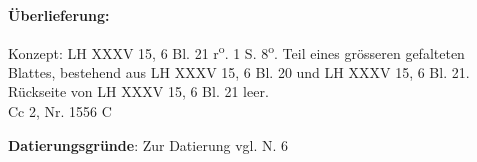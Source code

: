    
        
        \begin{ledgroupsized}[r]{120mm}
        \footnotesize 
        \pstart        
        \noindent\textbf{\"{U}berlieferung:}  
        \pend
        \end{ledgroupsized}
      
       
              \begin{ledgroupsized}[r]{114mm}
              \footnotesize 
              \pstart \parindent -6mm
              Konzept: LH XXXV 15, 6 Bl. 21 r\textsuperscript{o}. 1 S. 8\textsuperscript{o}. Teil eines gr\"{o}sseren gefalteten Blattes, bestehend aus LH XXXV 15, 6 Bl. 20 und LH XXXV 15, 6 Bl. 21. R\"{u}ckseite von LH XXXV 15, 6 Bl. 21 leer.\\Cc 2, Nr. 1556 C \pend
              \end{ledgroupsized}
        \vspace*{5mm}
        \begin{ledgroup}
        \footnotesize 
        \pstart
      \noindent\footnotesize{\textbf{Datierungsgr\"{u}nde}: Zur Datierung vgl. N. 6}
        \pend
        \end{ledgroup}
      

